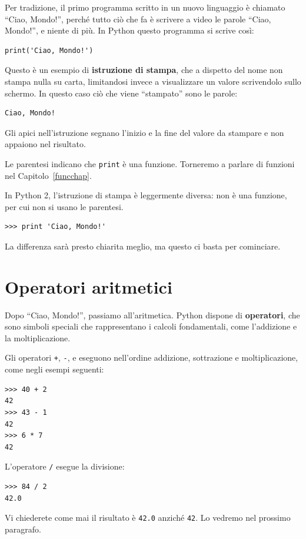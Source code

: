\documentclass[10pt]{book}
\begin{document}
Per tradizione, il primo programma scritto in un nuovo linguaggio è
chiamato ``Ciao, Mondo!'', perché tutto ciò che fa è scrivere a video le parole ``Ciao, Mondo!'', e niente di più. In Python questo programma si scrive così:

\begin{verbatim}
print('Ciao, Mondo!')
\end{verbatim}
%
Questo è un esempio di {\bf istruzione di stampa}, che a dispetto del nome non stampa nulla su carta, limitandosi invece a visualizzare un valore scrivendolo sullo schermo. In questo caso ciò che viene ``stampato'' sono le parole:

\begin{verbatim}
Ciao, Mondo!
\end{verbatim}
%
Gli apici nell'istruzione segnano l'inizio e la fine del valore da stampare e non appaiono nel risultato.

Le parentesi indicano che {\tt print} è una funzione. Torneremo a parlare di funzioni nel Capitolo~\ref{funcchap}.

In Python 2, l'istruzione di stampa è leggermente diversa: non è una funzione, per cui non si usano le parentesi.
\begin{verbatim}
>>> print 'Ciao, Mondo!'
\end{verbatim}
%
La differenza sarà presto chiarita meglio, ma questo ci basta per cominciare.

\section{Operatori aritmetici}

Dopo ``Ciao, Mondo!'', passiamo all'aritmetica. Python dispone di
{\bf operatori}, che sono simboli speciali che rappresentano i calcoli fondamentali, come l'addizione e la moltiplicazione.

Gli operatori {\tt +}, {\tt -}, e {\tt *} eseguono nell'ordine addizione, sottrazione e moltiplicazione, come negli esempi seguenti:

\begin{verbatim}
>>> 40 + 2
42
>>> 43 - 1
42
>>> 6 * 7
42
\end{verbatim}
%
L'operatore {\tt /} esegue la divisione:

\begin{verbatim}
>>> 84 / 2
42.0
\end{verbatim}
%
Vi chiederete come mai il risultato è {\tt 42.0} anziché {\tt 42}.
Lo vedremo nel prossimo paragrafo.
\end{document}
